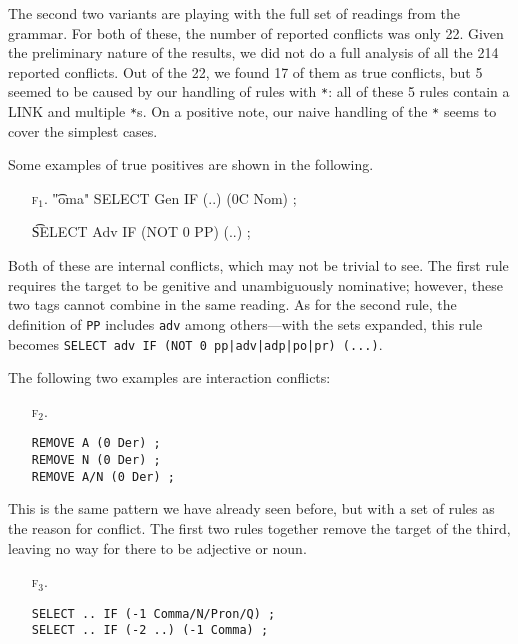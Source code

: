 The second two variants are playing with the full set of readings from the grammar. For both of these, the number of reported conflicts was only 22.
Given the preliminary nature of the results, we did not do a full analysis of all the 214 reported conflicts.
Out of the 22, we found 17 of them as true conflicts,
 but 5 seemed to be caused by our handling of rules with \verb!*!: all of these 5 rules contain a LINK and multiple \verb!*!s. On a positive note, our naive handling of the \verb!*! seems to cover the simplest cases.





Some examples of true positives are shown in the following.


\begin{itemize}
\item[\textsc{f$_1$}.]\t{"oma" SELECT Gen IF (..) (0C Nom) ;}

\item[] \t{SELECT Adv IF (NOT 0 PP) (..) ;}
\end{itemize}

Both of these are internal conflicts, which may not be trivial to see.
The first rule requires the target to be genitive and unambiguously nominative; however, these two tags cannot combine in the same reading.
As for the second rule, the definition of \texttt{PP} includes \texttt{adv} among others---with the sets expanded, this rule becomes \texttt{SELECT adv IF (NOT 0 pp|adv|adp|po|pr) (...)}.

The following two examples are interaction conflicts:

\begin{itemize}
\item[\textsc{f$_2$}.]\begin{verbatim}
REMOVE A (0 Der) ; 
REMOVE N (0 Der) ; 
REMOVE A/N (0 Der) ; 
\end{verbatim}
\end{itemize}

This is the same pattern we have already seen before, but with a set of rules as the reason for conflict.
The first two rules together remove the target of the third, leaving no way for there to be adjective or noun.

\begin{itemize}
\item[\textsc{f$_3$.}]\begin{verbatim}
SELECT .. IF (-1 Comma/N/Pron/Q) ;
SELECT .. IF (-2 ..) (-1 Comma) ;
\end{verbatim}
\end{itemize}

